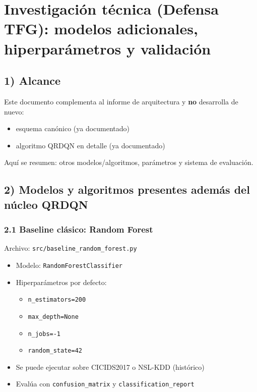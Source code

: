 ﻿\documentclass[12pt,a4paper]{article}
\begin{document}
\section{Investigación técnica (Defensa TFG): modelos adicionales, hiperparámetros y validación}

\subsection{1) Alcance}

Este documento complementa al informe de arquitectura y \textbf{no} desarrolla de nuevo:

\begin{itemize}
  \item esquema canónico (ya documentado)
  \item algoritmo QRDQN en detalle (ya documentado)
\end{itemize}

Aquí se resumen: otros modelos/algoritmos, parámetros y sistema de evaluación.

\subsection{2) Modelos y algoritmos presentes además del núcleo QRDQN}

\subsubsection{2.1 Baseline clásico: Random Forest}

Archivo: \verb|src/baseline_random_forest.py|

\begin{itemize}
  \item Modelo: \texttt{RandomForestClassifier}
  \item Hiperparámetros por defecto:
    \begin{itemize}
      \item \texttt{n\_estimators=200}
      \item \texttt{max\_depth=None}
      \item \texttt{n\_jobs=-1}
      \item \texttt{random\_state=42}
    \end{itemize}
  \item Se puede ejecutar sobre CICIDS2017 o NSL-KDD (histórico)
  \item Evalúa con \texttt{confusion\_matrix} y \texttt{classification\_report}
\end{itemize}
\end{document}
